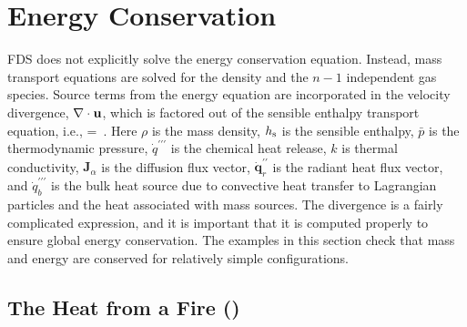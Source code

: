 \documentclass[11pt]{book}
\begin{document}
\clearpage

\section{Energy Conservation}

FDS does not explicitly solve the energy conservation equation. Instead, mass transport equations are solved for the density and the $n-1$ independent gas species. Source terms from the energy equation are incorporated in the velocity  divergence, $\nabla \cdot {\mathbf{u}}$, which is factored out of the sensible enthalpy transport equation, i.e.,
\be
\label{eqn_new_div}
\nabla\cdot{} =   \,\mbox{.}
\ee
Here $\rho$ is the mass density, $h_{\rm s}$ is the sensible enthalpy, $\bar{p}$ is the thermodynamic pressure, $\dot{q}^{\prime\prime\prime}$ is the chemical heat release, $k$ is thermal conductivity, $\mathbf{J}_\alpha$ is the diffusion flux vector, $\dot{\mathbf{q}}_r^{\prime\prime}$ is the radiant heat flux vector, and $\dot{q}_b^{\prime\prime\prime}$ is the bulk heat source due to convective heat transfer to Lagrangian particles and the heat associated with mass sources. The divergence is a fairly complicated expression, and it is important that it is computed properly to ensure global energy conservation. The examples in this section check that mass and energy are conserved for relatively simple configurations.

\subsection{The Heat from a Fire (\texorpdfstring{}{energy\_budget})}
\end{document}
